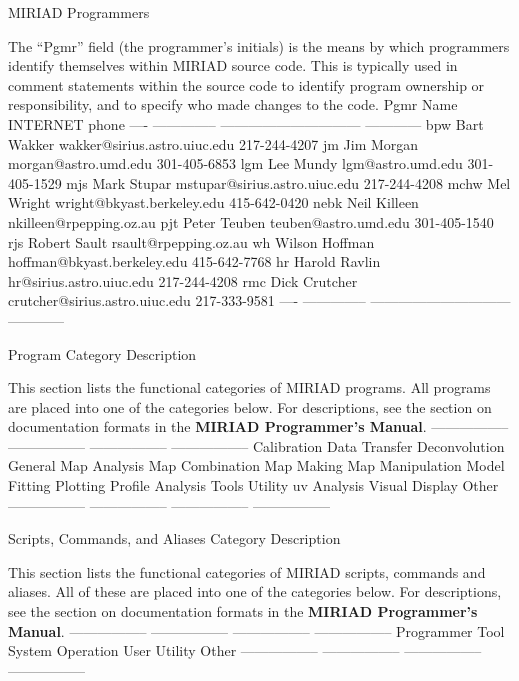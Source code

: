 \beginsection MIRIAD Programmers
\par The ``Pgmr'' field (the programmer's initials) is the means by which
programmers identify themselves within MIRIAD source code. This
is typically used in comment statements within the source code to
identify program ownership or responsibility, and to specify who
made changes to the code.
{\eightpoint\begintt
Pgmr     Name                      INTERNET               phone
----  --------------    ------------------------------ ------------
bpw   Bart Wakker       wakker@sirius.astro.uiuc.edu   217-244-4207
jm    Jim Morgan        morgan@astro.umd.edu           301-405-6853
lgm   Lee Mundy         lgm@astro.umd.edu              301-405-1529
mjs   Mark Stupar       mstupar@sirius.astro.uiuc.edu  217-244-4208
mchw  Mel Wright        wright@bkyast.berkeley.edu     415-642-0420
nebk  Neil Killeen      nkilleen@rpepping.oz.au
pjt   Peter Teuben      teuben@astro.umd.edu           301-405-1540
rjs   Robert Sault      rsault@rpepping.oz.au
wh    Wilson Hoffman    hoffman@bkyast.berkeley.edu    415-642-7768
hr    Harold Ravlin     hr@sirius.astro.uiuc.edu       217-244-4208
rmc   Dick Crutcher     crutcher@sirius.astro.uiuc.edu 217-333-9581
----  --------------    ------------------------------ ------------
\endtt}

\beginsection Program Category Description
\par This section lists the functional categories of MIRIAD programs.
All programs are placed into one of the categories below. For descriptions,
see the section on documentation formats in the {\bf MIRIAD Programmer's
Manual}.
{\eightpoint\begintt
-----------------   -----------------   -----------------   -----------------
Calibration         Data Transfer       Deconvolution       General
Map Analysis        Map Combination     Map Making          Map Manipulation
Model Fitting       Plotting            Profile Analysis    Tools
Utility             uv Analysis         Visual Display      Other
-----------------   -----------------   -----------------   -----------------
\endtt}

\beginsection Scripts, Commands, and Aliases Category Description
\par This section lists the functional categories of MIRIAD scripts,
commands and aliases. All of these are placed into one of the categories
below. For descriptions, see the section on documentation formats in the
{\bf MIRIAD Programmer's Manual}.
{\eightpoint\begintt
-----------------   -----------------   -----------------   -----------------
Programmer Tool     System Operation    User Utility        Other
-----------------   -----------------   -----------------   -----------------
\endtt}

